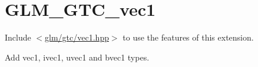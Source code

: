 \hypertarget{group__gtc__vec1}{}\section{G\+L\+M\+\_\+\+G\+T\+C\+\_\+vec1}
\label{group__gtc__vec1}
Include $<$\hyperlink{gtc_2vec1_8hpp}{glm/gtc/vec1.\+hpp}$>$ to use the features of this extension.

Add vec1, ivec1, uvec1 and bvec1 types. 